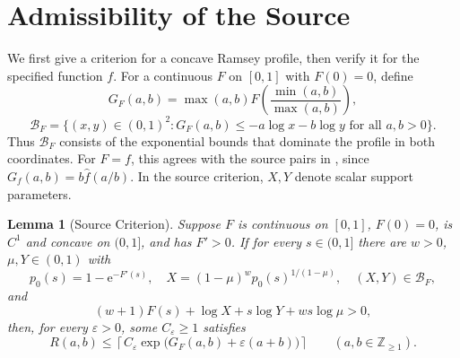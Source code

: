 \documentclass[11pt]{article}
\newtheorem{lemma}{Lemma}[section]
\theoremstyle{definition}
\newcommand{\e}{\mathrm e}
\newcommand{\BB}{\mathcal B}
\begin{document}
\section{Admissibility of the Source}\label{sec:source-proof}
We first give a criterion for a concave Ramsey profile, then verify it for the specified function $f$.
For a continuous $F$ on $[0,1]$ with $F(0)=0$, define
\[
 G_F(a,b)=\max(a,b)F\!\left(\frac{\min(a,b)}{\max(a,b)}\right),
\]
\[
 \BB_F=\{(x,y)\in(0,1)^2:
 G_F(a,b)\le-a\log x-b\log y\text{ for all }a,b>0\}.
\]
Thus $\BB_F$ consists of the exponential bounds that dominate the profile in both coordinates.
For $F=f$, this agrees with the source pairs in , since $G_f(a,b)=b\widehat f(a/b)$.
In the source criterion, $X,Y$ denote scalar support parameters.

\begin{lemma}[Source Criterion]\label{lem:source}
Suppose \(F\) is continuous on \([0,1]\), \(F(0)=0\), is \(C^1\) and concave on \((0,1]\), and has \(F'>0\). If for every \(s\in(0,1]\) there are \(w>0\), \(\mu,Y\in(0,1)\) with
\[
 p_0(s)=1-\e^{-F'(s)},\quad
 X=(1-\mu)^wp_0(s)^{1/(1-\mu)},\quad (X,Y)\in\BB_F,
\]
and
\begin{equation}\label{eq:source-slack}
 (w+1)F(s)+\log X+s\log Y+ws\log\mu>0,
\end{equation}
then, for every \(\varepsilon>0\), some \(C_\varepsilon\ge1\) satisfies
\begin{equation}\label{eq:source-finite}
 R(a,b)\le\left\lceil C_\varepsilon
 \exp\bigl(G_F(a,b)+\varepsilon(a+b)\bigr)\right\rceil
 \qquad(a,b\in\mathbb Z_{\ge1}).
\end{equation}

\end{lemma}
\end{document}
